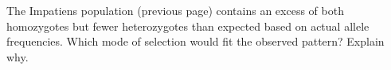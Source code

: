 \question[4]
The Impatiens population (previous page) contains an excess of both homozygotes but fewer heterozygotes than expected based on actual allele frequencies.  Which mode of selection would fit the observed pattern?  Explain why. 

